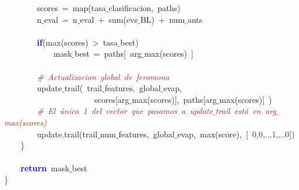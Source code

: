 \mbox{}\ \ \ \ \ \ \ \ scores\ \textcolor{BrickRed}{=}\ map\textcolor{BrickRed}{(}tasa$\_$clasificacion\textcolor{BrickRed}{,}\ paths\textcolor{BrickRed}{)} \\
\mbox{}\ \ \ \ \ \ \ \ n$\_$eval\ \textcolor{BrickRed}{=}\ n$\_$eval\ \textcolor{BrickRed}{+}\ sum\textcolor{BrickRed}{(}evs$\_$BL\textcolor{BrickRed}{)}\ \textcolor{BrickRed}{+}\ num$\_$ants \\
\mbox{} \\
\mbox{}\ \ \ \ \ \ \ \ \textbf{\textcolor{Blue}{if}}\textcolor{BrickRed}{(}max\textcolor{BrickRed}{(}scores\textcolor{BrickRed}{)}\ \textcolor{BrickRed}{\textgreater{}}\ tasa$\_$best\textcolor{BrickRed}{)} \\
\mbox{}\ \ \ \ \ \ \ \ \ \ \ \ mask$\_$best\ \textcolor{BrickRed}{=}\ paths\textcolor{BrickRed}{[}\ arg$\_$max\textcolor{BrickRed}{(}scores\textcolor{BrickRed}{)}\ \textcolor{BrickRed}{]} \\
\mbox{} \\
\mbox{}\ \ \ \ \ \ \ \ \textit{\textcolor{Brown}{\#\ Actualizacion\ global\ de\ feromona}} \\
\mbox{}\ \ \ \ \ \ \ \ update$\_$trail\textcolor{BrickRed}{(}\ trail$\_$features\textcolor{BrickRed}{,}\ global$\_$evap\textcolor{BrickRed}{,} \\
\mbox{}\ \ \ \ \ \ \ \ \ \ \ \ \ \ \ \ \ \ \ \ \ \ scores\textcolor{BrickRed}{[}arg$\_$max\textcolor{BrickRed}{(}scores\textcolor{BrickRed}{)],}\ paths\textcolor{BrickRed}{[}arg$\_$max\textcolor{BrickRed}{(}scores\textcolor{BrickRed}{)]}\ \textcolor{BrickRed}{)} \\
\mbox{}\ \ \ \ \ \ \ \ \textit{\textcolor{Brown}{\#\ El\ único\ 1\ del\ vector\ que\ pasamos\ a\ update$\_$trail\ está\ en\ arg$\_$max(scores)}} \\
\mbox{}\ \ \ \ \ \ \ \ update\textcolor{BrickRed}{.}trail\textcolor{BrickRed}{(}trail$\_$num$\_$features\textcolor{BrickRed}{,}\ global$\_$evap\textcolor{BrickRed}{,}\ max\textcolor{BrickRed}{(}score\textcolor{BrickRed}{),}\ \textcolor{BrickRed}{[}\ \textcolor{Purple}{0}\textcolor{BrickRed}{,}\textcolor{Purple}{0}\textcolor{BrickRed}{,...}\textcolor{Purple}{1}\textcolor{BrickRed}{,...}\textcolor{Purple}{0}\textcolor{BrickRed}{])} \\
\mbox{}\ \ \ \ \textcolor{Red}{\}} \\
\mbox{} \\
\mbox{}\ \ \ \ \textbf{\textcolor{Blue}{return}}\ mask$\_$best \\
\mbox{}\textcolor{Red}{\}} \\
\mbox{}
